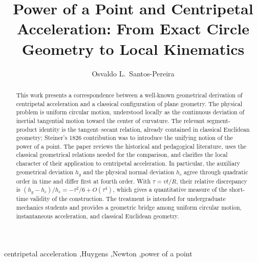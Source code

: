\documentclass[preprint,12pt,3p,nopreprintline]{elsarticle}
\def\corref#1{}%
\def\fnref#1{}%
\numberwithin{equation}{section}
\theoremstyle{remark}
\begin{document}
\begin{frontmatter}

\title{\Large Power of a Point and Centripetal Acceleration: From Exact Circle Geometry to Local Kinematics}

\author[1]{Osvaldo L.\ Santos-Pereira\corref{cor3}\fnref{fn1}}

\address[1]{Physics Institute, Universidade Federal do Rio de Janeiro, Rio de Janeiro, Brazil}


\begin{abstract}
This work presents a correspondence between a well-known geometrical derivation of centripetal acceleration and a classical configuration of plane geometry. The physical problem is uniform circular motion, understood locally as the continuous deviation of inertial tangential motion toward the center of curvature. The relevant segment-product identity is the tangent--secant relation, already contained in classical Euclidean geometry; Steiner's 1826 contribution was to introduce the unifying notion of the power of a point. The paper reviews the historical and pedagogical literature, uses the classical geometrical relations needed for the comparison, and clarifies the local character of their application to centripetal acceleration. In particular, the auxiliary geometrical deviation $h_g$ and the physical normal deviation $h_c$ agree through quadratic order in time and differ first at fourth order. With $\tau=vt/R$, their relative discrepancy is $(h_g-h_c)/h_c=-\tau^2/6+O(\tau^4)$, which gives a quantitative measure of the short-time validity of the construction. The treatment is intended for undergraduate mechanics students and provides a geometric bridge among uniform circular motion, instantaneous acceleration, and classical Euclidean geometry.
\end{abstract}

\begin{keyword}
centripetal acceleration \sep Huygens \sep Newton \sep power of a point
\end{keyword}

\end{frontmatter}

\clearpage
\thispagestyle{plain}

\end{document}

